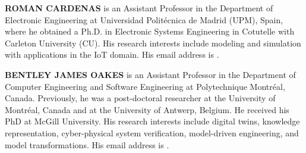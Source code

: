 \documentclass{scspaperproc}
\theoremstyle{scsthe}
\begin{document}
\textbf{\uppercase{Roman Cardenas}} is an Assistant Professor in the Department of Electronic Engineering at Universidad Politécnica de Madrid (UPM), Spain, where he obtained a Ph.D. in Electronic Systems Engineering
in Cotutelle with Carleton University (CU). His research interests include modeling and simulation with
applications in the IoT domain. His email address is .

\textbf{\uppercase{Bentley James Oakes}} is an Assistant Professor in the Department of Computer Engineering and Software Engineering at Polytechnique Montr\'{e}al, Canada. Previously, he was a post-doctoral researcher at the University of Montr\'{e}al, Canada and at the University of Antwerp, Belgium. He received his PhD at McGill University. His research interests include digital twins, knowledge representation, cyber-physical system verification, model-driven engineering, and model transformations. His email address is .
\end{document}
